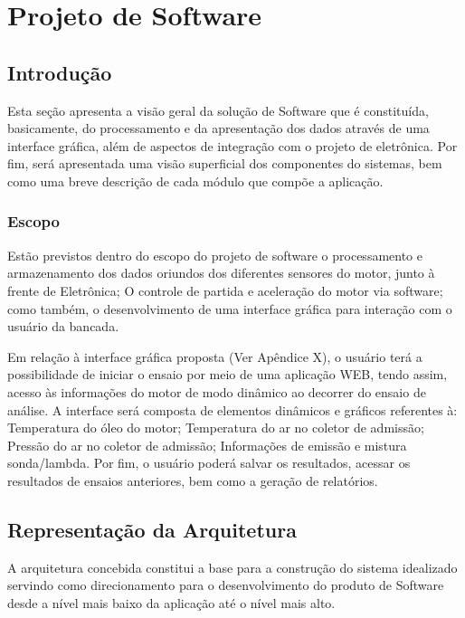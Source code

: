 \chapter[Projeto de Software]{Projeto de Software}

\section{Introdução}

Esta seção apresenta a visão geral da solução de Software que é constituída, basicamente, do processamento e da apresentação dos dados através de uma interface gráfica, além de aspectos de integração com o projeto de eletrônica. Por fim, será apresentada uma visão superficial dos componentes do sistemas, bem como uma breve descrição de cada módulo que compõe a aplicação. 

\subsection{Escopo}

Estão previstos dentro do escopo do projeto de software o processamento e armazenamento dos dados oriundos dos diferentes sensores do motor, junto à frente de Eletrônica; O controle de partida e aceleração do motor via software; como também, o desenvolvimento de uma interface gráfica para interação com o usuário da bancada.

Em relação à interface gráfica proposta (Ver Apêndice X), o usuário terá a possibilidade de iniciar o ensaio por meio de uma aplicação WEB, tendo assim, acesso às informações do motor de modo dinâmico ao decorrer do ensaio de análise. A interface será composta de elementos dinâmicos e gráficos referentes à: Temperatura do óleo do motor; Temperatura do ar no coletor de admissão; Pressão do ar no coletor de admissão; Informações de emissão e mistura sonda/lambda. Por fim, o usuário poderá salvar os resultados, acessar os resultados de ensaios anteriores, bem como a geração de relatórios.

\section{Representação da Arquitetura}

A arquitetura concebida constitui a base para a construção do sistema idealizado servindo como direcionamento para o desenvolvimento do produto de Software desde a nível mais baixo da aplicação até o nível mais alto.

